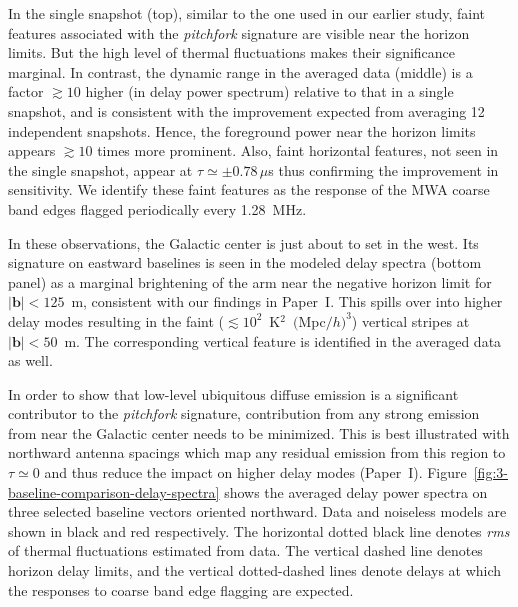 \documentclass[preprint2,apjl,numberedappendix,twocolappendix,appendixfloats]{emulateapj}
\begin{document}
\begin{figure}[htb]
\end{figure}

In the single snapshot (top), similar to the one used in our earlier study, faint features associated with the {\it pitchfork} signature are visible near the horizon limits. But the high level of thermal fluctuations makes their significance marginal. In contrast, the dynamic range in the averaged data (middle) is a factor $\gtrsim 10$ higher (in delay power spectrum) relative to that in a single snapshot, and is consistent with the improvement expected from averaging 12 independent snapshots. Hence, the foreground power near the horizon limits appears $\gtrsim 10$ times more prominent. Also, faint horizontal features, not seen in the single snapshot, appear at $\tau \simeq \pm 0.78\,\mu$s thus confirming the improvement in sensitivity. We identify these faint features as the response of the MWA coarse band edges flagged periodically every 1.28~MHz. 

In these observations, the Galactic center is just about to set in the west. Its signature on eastward baselines is seen in the modeled delay spectra (bottom panel) as a marginal brightening of the arm near the negative horizon limit for $|\boldsymbol{b}| < 125$~m, consistent with our findings in Paper~I. This spills over into higher delay modes resulting in the faint ($\lesssim 10^2$~K$^2$~$($Mpc$/h)^3$) vertical stripes at $|\boldsymbol{b}| < 50$~m. The corresponding vertical feature is identified in the averaged data as well.

In order to show that low-level ubiquitous diffuse emission is a significant contributor to the {\it pitchfork} signature, contribution from any strong emission from near the Galactic center needs to be minimized. This is best illustrated with northward antenna spacings which map any residual emission from this region to $\tau\simeq 0$ and thus reduce the impact on higher delay modes (Paper~I). Figure~\ref{fig:3-baseline-comparison-delay-spectra} shows the averaged delay power spectra on three selected baseline vectors oriented northward. Data and noiseless models are shown in black and red respectively. The horizontal dotted black line denotes {\it rms} of thermal fluctuations estimated from data. The vertical dashed line denotes horizon delay limits, and the vertical dotted-dashed lines denote delays at which the responses to coarse band edge flagging are expected.
\end{document}
